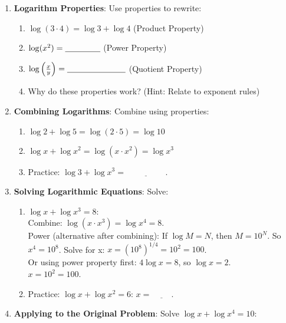 \documentclass[12pt]{article}
\begin{document}
\begin{enumerate}[label=24.\arabic*]
    \item \textbf{Logarithm Properties}: Use properties to rewrite:
    \begin{enumerate}[label=\alph*)]
        \item \( \log(3 \cdot 4) = \log 3 + \log 4 \) (Product Property)
        \item \( \log(x^2) = \underline{\hspace{1.5cm}} \) (Power Property)
        \item \( \log\left(\frac{x}{y}\right) = \underline{\hspace{2.5cm}} \) (Quotient Property)
        \item Why do these properties work? \underline{\hspace{6cm}} (Hint: Relate to exponent rules)
    \end{enumerate}
    \item \textbf{Combining Logarithms}: Combine using properties:
    \begin{enumerate}[label=\alph*)]
        \item \( \log 2 + \log 5 = \log(2 \cdot 5) = \log 10 \)
        \item \( \log x + \log x^2 = \log(x \cdot x^2) = \log x^3 \)
        \item Practice: \( \log 3 + \log x^3 = \underline{\hspace{2cm}} \).
    \end{enumerate}
    \item \textbf{Solving Logarithmic Equations}: Solve:
    \begin{enumerate}[label=\alph*)]
        \item \( \log x + \log x^3 = 8 \): \\
        Combine: \( \log(x \cdot x^3) = \log x^4 = 8 \). \\
        Power (alternative after combining): If \( \log M = N \), then \( M = 10^N \). So \( x^4 = 10^8 \).
        Solve for x: \( x = (10^8)^{1/4} = 10^2 = 100 \). \\
        Or using power property first: \( 4 \log x = 8 \), so \( \log x = 2 \). \\
        \( x = 10^2 = 100 \).
        \item Practice: \( \log x + \log x^2 = 6 \): \( x = \underline{\hspace{1cm}} \).
    \end{enumerate}
    \item \textbf{Applying to the Original Problem}: Solve \( \log x + \log x^4 = 10 \):

\end{enumerate}
\end{document}
